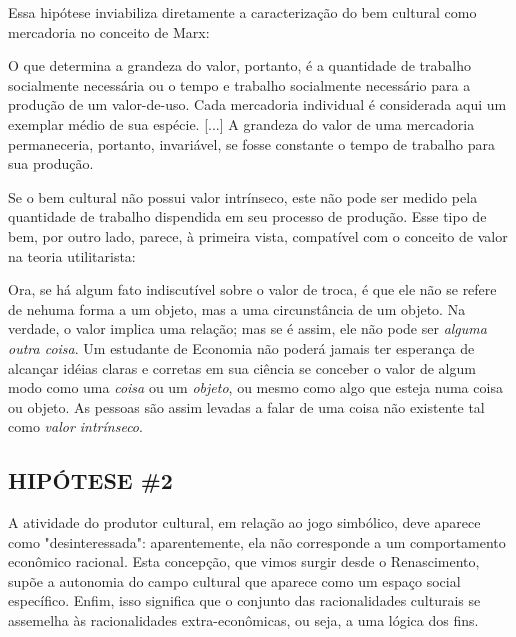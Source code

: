 \documentclass[
]{article}
\newenvironment{citacao}
    {\begin{quoting}[rightmargin=0cm,leftmargin=4cm]
    \begin{singlespace}
    \footnotesize
    }
    {\end{singlespace}
    \end{quoting}
    }
\begin{document}
Essa hipótese inviabiliza diretamente a caracterização do bem cultural
como mercadoria no conceito de Marx:

\begin{citacao}
O que determina a grandeza do valor, portanto, é a quantidade de trabalho socialmente necessária ou o tempo e trabalho socialmente necessário para a produção de um valor-de-uso. Cada mercadoria individual é considerada aqui um exemplar médio de sua espécie. [...] A grandeza do valor de uma mercadoria permaneceria, portanto, invariável, se fosse constante o tempo de trabalho para sua produção. \citep[p.~61]{marx}
\end{citacao}

Se o bem cultural não possui valor intrínseco, este não pode ser medido
pela quantidade de trabalho dispendida em seu processo de produção. Esse
tipo de bem, por outro lado, parece, à primeira vista, compatível com o
conceito de valor na teoria utilitarista:

\begin{citacao}
Ora, se há algum fato indiscutível sobre o valor de troca, é que ele não se refere de nehuma forma a um objeto, mas a uma circunstância de um objeto. Na verdade, o valor implica uma relação; mas se é assim, ele não pode ser \textit{alguma outra coisa}. Um estudante de Economia não poderá jamais ter esperança de alcançar idéias claras e corretas em sua ciência se conceber o valor de algum modo como uma \textit{coisa} ou um \textit{objeto}, ou mesmo como algo que esteja numa coisa ou objeto. As pessoas são assim levadas a falar de uma coisa não existente tal como \textit{valor intrínseco}. \citep[p.~66]{jevons}
\end{citacao}

\hypertarget{hipuxf3tese-2}{%
\subsection{HIPÓTESE \#2}\label{hipuxf3tese-2}}

\begin{citacao}
A atividade do produtor cultural, em relação ao jogo simbólico, deve aparece como "desinteressada": aparentemente, ela não corresponde a um comportamento econômico racional. Esta concepção, que vimos surgir desde o Renascimento, supõe a autonomia do campo cultural que aparece como um espaço social específico. Enfim, isso significa que o conjunto das racionalidades culturais se assemelha às racionalidades extra-econômicas, ou seja, a uma lógica dos fins. \citep[p.~31]{herscovici}
\end{citacao}
\end{document}

